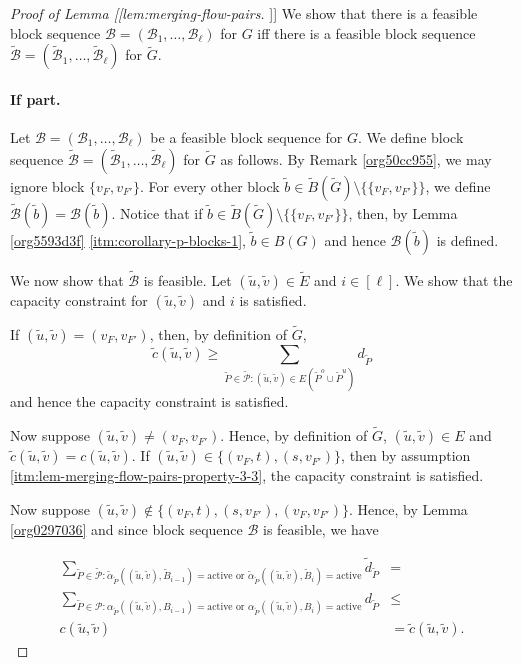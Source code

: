 \documentclass[fontsize=11pt,paper=a4]{book}
\begin{document}
\begin{proof}[Proof of Lemma [[lem:merging-flow-pairs]]]
We show that there is a feasible block sequence \(\mathcal{B}=(\mathscr{B}_1,\dots,\mathscr{B}_{\ell})\) for \(G\) iff there is a feasible block sequence \(\tilde{\mathcal{B}}=(\tilde{\mathscr{B}}_1,\dots,\tilde{\mathscr{B}}_{\ell})\) for \(\tilde{G}\).

\paragraph{If part.}
Let \(\mathcal{B}=(\mathscr{B}_1,\dots,\mathscr{B}_{\ell})\) be a feasible block sequence for \(G\).
We define block sequence \(\tilde{\mathcal{B}}=(\tilde{\mathscr{B}}_1,\dots,\tilde{\mathscr{B}}_{\ell})\) for \(\tilde{G}\) as follows.
By Remark \ref{org50cc955}, we may ignore block \(\{v_F,v_{F'}\}\).
For every other block \(\tilde{b}\in\tilde{B}(\tilde{G})\setminus\{\{v_F,v_{F'}\}\}\), we define \(\tilde{\mathcal{B}}(\tilde{b})=\mathcal{B}(\tilde{b})\).
Notice that if \(\tilde{b}\in\tilde{B}(\tilde{G})\setminus\{\{v_F,v_{F'}\}\}\), then, by Lemma \ref{org5593d3f} \ref{itm:corollary-p-blocks-1}, \(\tilde{b}\in B(G)\) and hence \(\mathcal{B}(\tilde{b})\) is defined.

We now show that \(\tilde{\mathcal{B}}\) is feasible.
Let \((\tilde{u},\tilde{v})\in\tilde{E}\) and \(i\in[\ell]\).
We show that the capacity constraint for \((\tilde{u},\tilde{v})\) and \(i\) is satisfied.

If \((\tilde{u},\tilde{v})=(v_F,v_{F'})\), then, by definition of \(\tilde{G}\),
\[
\tilde{c}(\tilde{u},\tilde{v})\geq\sum_{\tilde{P}\in\tilde{\mathcal{P}}:(\tilde{u},\tilde{v})\in E(\tilde{P}^o\cup\tilde{P}^u)}d_{\tilde{P}}
\]
and hence the capacity constraint is satisfied.

Now suppose \((\tilde{u},\tilde{v})\neq(v_F,v_{F'})\).
Hence, by definition of \(\tilde{G}\), \((\tilde{u},\tilde{v})\in E\) and \(\tilde{c}(\tilde{u},\tilde{v})=c(\tilde{u},\tilde{v})\).
If \((\tilde{u},\tilde{v})\in\{(v_F,t),(s,v_{F'})\}\), then by assumption \ref{itm:lem-merging-flow-pairs-property-3-3}, the capacity constraint is satisfied.

Now suppose \((\tilde{u},\tilde{v})\notin\{(v_F,t),(s,v_{F'}),(v_F,v_{F'})\}\).
Hence, by Lemma \ref{org0297036} and since block sequence \(\mathcal{B}\) is feasible, we have

\begin{align*}
\sum_{\tilde{P}\in\tilde{\mathcal{P}}:\tilde{\alpha}_{\tilde{P}}((\tilde{u},\tilde{v}),\tilde{B}_{i-1})=\mathrm{active}\text{ or }\tilde{\alpha}_{\tilde{P}}((\tilde{u},\tilde{v}),\tilde{B}_i)=\mathrm{active}}\tilde{d}_{\tilde{P}}&=\\
\sum_{\tilde{P}\in\mathcal{P}:\alpha_{\tilde{P}}((\tilde{u},\tilde{v}),B_{i-1})=\mathrm{active}\text{ or }\alpha_{\tilde{P}}((\tilde{u},\tilde{v}),B_i)=\mathrm{active}}d_{\tilde{P}}&\leq\\
c(\tilde{u},\tilde{v})&=
\tilde{c}(\tilde{u},\tilde{v}).
\end{align*}


\end{proof}
\end{document}
